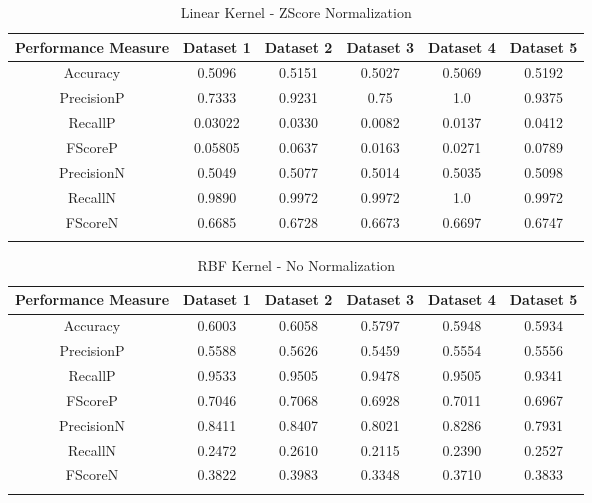 \begin{center}
\begin{longtable}{| c | c | c | c | c | c |}      
    \hline
    Performance Measure & Dataset 1 & Dataset 2 & Dataset 3 & Dataset 4 & Dataset 5 \\ \hline
    Accuracy & 0.5096 & 0.5151 & 0.5027 & 0.5069 & 0.5192 \\ \hline 
    PrecisionP & 0.7333 & 0.9231 & 0.75 & 1.0 & 0.9375 \\ \hline
    RecallP & 0.03022 & 0.0330 & 0.0082 & 0.0137 & 0.0412 \\ \hline
    FScoreP & 0.05805 & 0.0637 & 0.0163 & 0.0271 & 0.0789 \\ \hline %
    PrecisionN & 0.5049 & 0.5077 & 0.5014 & 0.5035 & 0.5098 \\ \hline
    RecallN & 0.9890 & 0.9972 & 0.9972 & 1.0 & 0.9972 \\ \hline
    FScoreN & 0.6685 & 0.6728 & 0.6673 & 0.6697 & 0.6747 \\ \hline %
    \caption{Linear Kernel - ZScore Normalization}
  \label{tab:LinearKernelZScoreNormalization}
\end{longtable}
\end{center}

\begin{center}
\begin{longtable}{| c | c | c | c | c | c |}      
    \hline
    Performance Measure & Dataset 1 & Dataset 2 & Dataset 3 & Dataset 4 & Dataset 5 \\ \hline
    Accuracy & 0.6003 & 0.6058 & 0.5797 & 0.5948 & 0.5934 \\ \hline
    PrecisionP & 0.5588 & 0.5626 & 0.5459 & 0.5554 & 0.5556 \\ \hline
    RecallP & 0.9533 & 0.9505 & 0.9478 & 0.9505 & 0.9341 \\ \hline
    FScoreP & 0.7046 & 0.7068 & 0.6928 & 0.7011 & 0.6967 \\ \hline %
    PrecisionN & 0.8411 & 0.8407 & 0.8021 & 0.8286 & 0.7931 \\ \hline
    RecallN & 0.2472 & 0.2610 & 0.2115 & 0.2390 & 0.2527 \\ \hline
    FScoreN & 0.3822 & 0.3983 & 0.3348 & 0.3710 & 0.3833 \\ \hline %
    \caption{RBF Kernel - No Normalization}
  \label{tab:RBFKernelNoNormalization}
\end{longtable}
\end{center}

